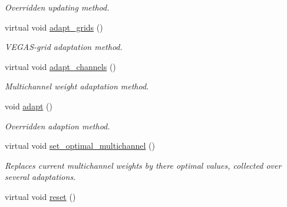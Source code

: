 \begin{DoxyCompactItemize}
\begin{DoxyCompactList}\small\item\em Overridden updating method. \end{DoxyCompactList}\item 
\hypertarget{a00441_a8dadcf764ebcfca1e05156866e24f81c}{virtual void \hyperlink{a00441_a8dadcf764ebcfca1e05156866e24f81c}{adapt\-\_\-grids} ()}\label{a00441_a8dadcf764ebcfca1e05156866e24f81c}

\begin{DoxyCompactList}\small\item\em V\-E\-G\-A\-S-\/grid adaptation method. \end{DoxyCompactList}\item 
\hypertarget{a00441_aee5d39cdf937f3399d682e95d19f1fb6}{virtual void \hyperlink{a00441_aee5d39cdf937f3399d682e95d19f1fb6}{adapt\-\_\-channels} ()}\label{a00441_aee5d39cdf937f3399d682e95d19f1fb6}

\begin{DoxyCompactList}\small\item\em Multichannel weight adaptation method. \end{DoxyCompactList}\item 
\hypertarget{a00441_aaa93653cd53498e56183fa5857b396ea}{void \hyperlink{a00441_aaa93653cd53498e56183fa5857b396ea}{adapt} ()}\label{a00441_aaa93653cd53498e56183fa5857b396ea}

\begin{DoxyCompactList}\small\item\em Overridden adaption method. \end{DoxyCompactList}\item 
virtual void \hyperlink{a00441_a1cf371f098235bf3735048b78ee3bb09}{set\-\_\-optimal\-\_\-multichannel} ()
\begin{DoxyCompactList}\small\item\em Replaces current multichannel weights by there optimal values, collected over several adaptations. \end{DoxyCompactList}\item 
\hypertarget{a00441_a205f3c5d763897f3d031ded8e0b99dc0}{virtual void \hyperlink{a00441_a205f3c5d763897f3d031ded8e0b99dc0}{reset} ()}\label{a00441_a205f3c5d763897f3d031ded8e0b99dc0}


\end{DoxyCompactItemize}
